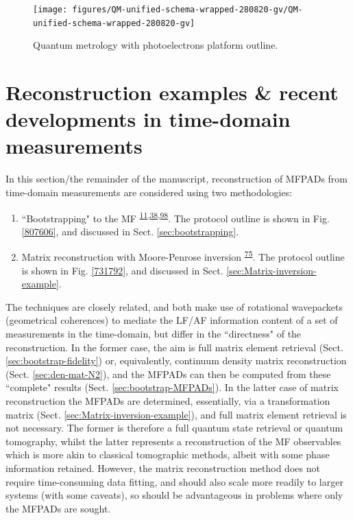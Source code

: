 \documentclass[10pt]{article}
\begin{document}
\begin{figure}[H]
\begin{center}
\texttt{[image: figures/QM-unified-schema-wrapped-280820-gv/QM-unified-schema-wrapped-280820-gv]}
\caption{{Quantum metrology with photoelectrons platform outline.
{\label{239231}}%
}}
\end{center}
\end{figure}

\section{Reconstruction examples \& recent developments in time-domain measurements\label{sec:Recon}}

In this section/the remainder of the manuscript, reconstruction of MFPADs from time-domain measurements are considered using two methodologies:

\begin{enumerate}
\item ``Bootstrapping" to the MF \textsuperscript{\hyperref[csl:11]{11},\hyperref[csl:38]{38},\hyperref[csl:98]{98}}. The protocol outline is shown in Fig. \ref{807606}, and discussed in Sect. \ref{sec:bootstrapping}.
\item Matrix reconstruction with Moore-Penrose inversion \textsuperscript{\hyperref[csl:75]{75}}. The protocol outline is shown in Fig. \ref{731792}, and discussed in Sect. \ref{sec:Matrix-inversion-example}.
\end{enumerate}

The techniques are closely related, and both make use of rotational wavepackets (geometrical coherences) to mediate the LF/AF information content of a set of measurements in the time-domain, but differ in the ``directness" of the reconstruction. In the former case, the aim is full matrix element retrieval (Sect. \ref{sec:bootstrap-fidelity}) or, equivalently, continuum density matrix reconstruction (Sect. \ref{sec:den-mat-N2}), and the MFPADs can then be computed from these ``complete" results (Sect. \ref{sec:bootstrap-MFPADs}). In the latter case of matrix reconstruction the MFPADs are determined, essentially, via a transformation matrix (Sect. \ref{sec:Matrix-inversion-example}), and full matrix element retrieval is not necessary. The former is therefore a full quantum state retrieval or quantum tomography, whilst the latter represents a reconstruction of the MF observables which is more akin to classical tomographic methods, albeit with some phase information retained. %
However, the matrix reconstruction method does not require time-consuming data fitting, and should also scale more readily to larger systems (with some caveats), so should be advantageous in problems where only the MFPADs are sought.
\end{document}
